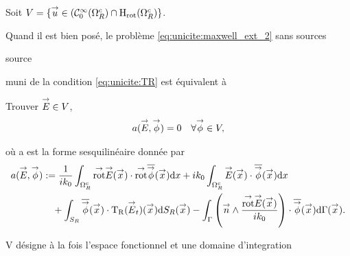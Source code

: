   Soit \(V = \lbrace \vect{u} \in (\mathcal{C}_0^\infty(\OO^c_R)\cap\Hrot(\OO^c_R) \rbrace\).

  Quand il est bien posé, le problème \eqref{eq:unicite:maxwell_ext_2} sans sources
  \begin{REM}
  source
\end{REM} muni de la condition \eqref{eq:unicite:TR} est équivalent à
  \begin{prop}
    Trouver \(\vE \in V\),
    \begin{align*}
      a(\vE,\vect\phi) = 0 && \forall \vect \phi \in V,
    \end{align*}

    où a est la forme sesquilinéaire donnée par
    \begin{equation*}
      \begin{aligned}
      a(\vE,\vect\phi) &:=  \frac{1}{ik_0} \int_{\OO^c_R} \trot \vE(\vx) \cdot \trot \conj{\vect{\phi}}(\vx) \dd{x} + ik_0\int_{\OO^c_R}\vE(\vx)\cdot\conj{\vect{\phi}}(\vx) \dd{x}
        \\ 
        & \quad + \int_{S_R} \conj{ \vect \phi }(\vx) \cdot \Tr(\vE_t)(\vx) \dd{S_R}(\vx) - \int_\Gamma \left(\vn \pvect \frac{\trot \vE(\vx)}{ik_0}\right) \cdot \conj{\vect \phi} (\vx) \dd{\Gamma}(\vx).
      \end{aligned}
    \end{equation*}
  \end{prop}
  \begin{REM}
  V désigne à la fois l'espace fonctionnel et une domaine d'integration
\end{REM}
